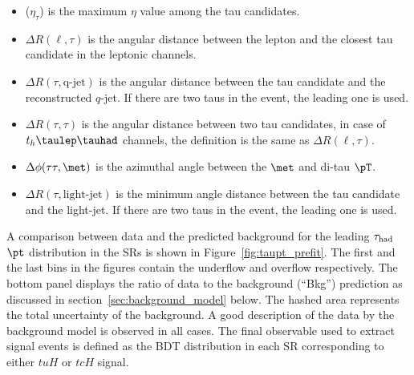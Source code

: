 \begin{itemize}
\item {}($\eta_{\tau}$) is the maximum $\eta$ value among the tau candidates.
\item $\Delta R(\ell,\tau)$ is the angular distance between the lepton and the closest tau candidate in the leptonic channels.
\item $\Delta R(\tau,\text{q-jet})$ is the angular distance between the tau candidate and the reconstructed $q$-jet. If there are two taus in the event, the leading one is used.
\item $\Delta R(\tau,\tau)$ is the angular distance between two tau candidates, in case of $t_h\tlhad$ channels, the definition is the same as $\Delta R(\ell,\tau)$.
\item $\Delta\phi(\tau\tau,\met)$ is the azimuthal angle between the $\met$ and di-tau $\pT$.
\item $\Delta R(\tau,\text{light-jet})$ is the minimum angle distance between the tau candidate and the light-jet. If there are two taus in the event, the leading one is used.
\end{itemize}
A comparison between data and the predicted background for the leading $\tau_{\mathrm{had}}$ $\pt$ distribution in the SRs 
is shown in Figure~\ref{fig:taupt_prefit}.
The first and the last bins in the figures contain the underflow and overflow respectively.
The bottom panel displays the ratio of data to the background (``Bkg'') prediction as discussed in section~\ref{sec:background_model} below.
The hashed area represents the total uncertainty of the background.
A good description of the data by the background model is observed in all cases.
The final observable used to extract signal events is defined as the BDT distribution in each SR corresponding to either $tuH$ or $tcH$ signal.
